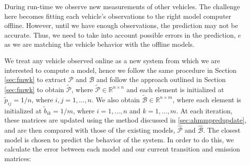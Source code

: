 \documentclass[letterpaper, 10 pt, conference]{ieeeconf}  %
\newcommand\NB[1]{$\spadesuit$\footnote{NB: #1}}
\begin{document}

During run-time we observe new measurements of other vehicles. The challenge here becomes fitting each vehicle's observations to the right model computer offline. However, until we have enough observations, the prediction may not be accurate. Thus, we need to take into account possible errors in the prediction, $e$ as we are matching the vehicle behavior with the offline models. 



We treat any vehicle observed online as a new system from which we are interested to compute a model, hence we follow the same procedure in Section \ref{sec:fmwk} to extract $\mathcal{P}$ and $\mathcal{B}$ and follow the approach outlined in Section \ref{sec:fmwk} to obtain $\tilde{\mathcal{P}}$, where $\tilde{\mathcal{P}}\in\mathbb{R}^{n\times n}$ and each element is initialized at $\tilde{p}_{ij} = 1/n$, where $i,j = 1,\ldots,n$. We also obtain $\tilde{\mathcal{B}}\in\mathbb{R}^{n\times m}$, where each element is initialized at $\tilde{b}_{ik}= 1/m$, where $i = 1,\ldots,n$ and $k=1,\ldots,m$. At each iteration, these matrices are updated using the method discussed in \ref{sec:ahmmpredupdate}, and are then compared with those of the existing models, $\hat{\mathcal{P}}$ and $\hat{\mathcal{B}}$. The closest model is chosen to predict the behavior of the system. In order to do this, we calculate the error between each model and our current transition and emission matrices:
\end{document}
